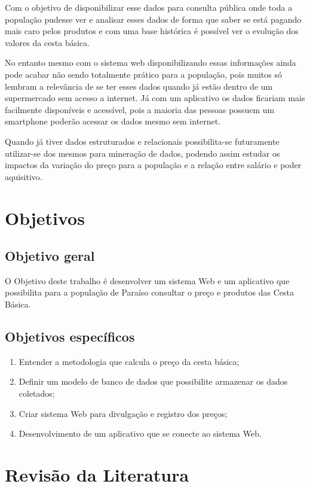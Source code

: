 \documentclass{ifto-tex}
\begin{document}
		Com o objetivo de disponibilizar esse dados para consulta pública onde toda a população pudesse ver e analisar esses dados de forma que saber se está pagando mais caro pelos produtos e com uma base histórica é possível ver o evolução dos valores da cesta básica.
		
		No entanto mesmo com o sistema web disponibilizando essas informações ainda pode acabar não sendo totalmente prático para a população, pois muitos só lembram a relevância de se ter esses dados quando já estão dentro de um supermercado sem acesso a internet. Já com um aplicativo os dados ficariam mais facilmente disponíveis e acessível, pois a maioria das pessoas possuem um smartphone poderão acessar os dados mesmo sem internet.
		
		Quando já tiver dados estruturados e relacionais possibilita-se futuramente utilizar-se dos mesmos para mineração de dados, podendo assim estudar os impactos da variação do preço para a população e a relação entre salário e poder aquisitivo.
		
	
\chapter{Objetivos}
	
	\section{Objetivo geral}
	
		O Objetivo deste trabalho é desenvolver um sistema Web e um aplicativo que possibilita para a população de Paraíso consultar o preço e produtos das Cesta Básica.
	
	\section{Objetivos específicos}
	
		\begin{enumerate}
			\item Entender a metodologia que calcula o preço da cesta básica;
			\item Definir um modelo de banco de dados que possibilite armazenar os dados coletados;
			\item Criar sistema Web para divulgação e registro dos preços;
			\item Desenvolvimento de um aplicativo que se conecte ao sistema Web.
		\end{enumerate}

\chapter{Revisão da Literatura}
\end{document}
